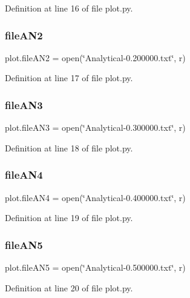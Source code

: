 Definition at line 16 of file plot.\+py.

\mbox{\label{namespaceplot_abec9e06c1ce1039e93dbfe084d28618e}} 
\subsubsection{file\+A\+N2}
{\footnotesize\ttfamily plot.\+file\+A\+N2 = open(\char`\"{}Analytical-\/0.\+200000.txt\char`\"{}, \textquotesingle{}r\textquotesingle{})}



Definition at line 17 of file plot.\+py.

\mbox{\label{namespaceplot_a3b9285216ce4a628a3b173cda61aa903}} 
\subsubsection{file\+A\+N3}
{\footnotesize\ttfamily plot.\+file\+A\+N3 = open(\char`\"{}Analytical-\/0.\+300000.txt\char`\"{}, \textquotesingle{}r\textquotesingle{})}



Definition at line 18 of file plot.\+py.

\mbox{\label{namespaceplot_a30e629e69ff8465f54df1447116a8755}} 
\subsubsection{file\+A\+N4}
{\footnotesize\ttfamily plot.\+file\+A\+N4 = open(\char`\"{}Analytical-\/0.\+400000.txt\char`\"{}, \textquotesingle{}r\textquotesingle{})}



Definition at line 19 of file plot.\+py.

\mbox{\label{namespaceplot_a92057010a89e3d7dc8e2c3fe6135ef50}} 
\subsubsection{file\+A\+N5}
{\footnotesize\ttfamily plot.\+file\+A\+N5 = open(\char`\"{}Analytical-\/0.\+500000.txt\char`\"{}, \textquotesingle{}r\textquotesingle{})}



Definition at line 20 of file plot.\+py.

